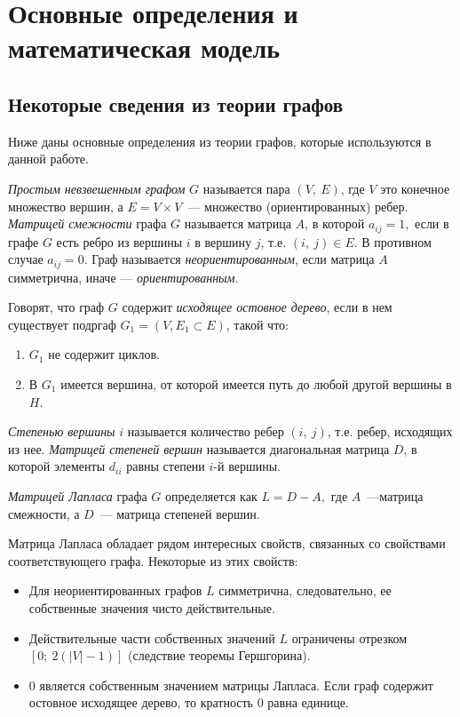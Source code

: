 \chapter{Основные определения и математическая модель} \label{definitions}

\section{Некоторые сведения из теории графов}
Ниже даны основные определения из теории графов, которые используются в данной работе.

\emph{Простым невзвешенным графом} $G$ называется пара $(V,\ E)$, где $V$ это конечное множество вершин, а $E=V\times V$~--- множество (ориентированных) ребер. 
\emph{Матрицей смежности} графа $G$ называется матрица $A$, в которой $a_{ij}=1,$ если в графе $G$ есть ребро из вершины $i$ в вершину $j$, т.е. $(i,\ j)\in E.$ В противном случае $a_{ij}=0.$
Граф называется \emph{неориентированным}, если матрица $A$ симметрична, иначе --- \emph{ориентированным}. 

Говорят, что граф $G$ содержит \emph{исходящее остовное дерево}, если в нем существует подргаф $G_1=(V, E_1\subset E)$, такой что:
\begin{enumerate}
\item $G_1$ не содержит циклов.
\item В $G_1$ имеется вершина, от которой имеется путь до любой другой вершины в $H$.
\end{enumerate}

\emph{Степенью вершины} $i$ называется количество ребер $(i,\ j)$, т.е. ребер, исходящих из нее.
\emph{Матрицей степеней вершин} называется диагональная матрица $D$, в которой элементы $d_{ii}$ равны степени $i$-й вершины.

\begin{definition}
\emph{Матрицей Лапласа} графа $G$ определяется как $L=D-A,$ где $A$~---матрица смежности, а $D$~--- матрица степеней вершин.
\end{definition}

Матрица Лапласа обладает рядом интересных свойств, связанных со свойствами соответствующего графа. Некоторые из этих свойств:

\begin{itemize}
\item Для неориентированных графов $L$ симметрична, следовательно, ее собственные значения чисто действительные.
\item Действительные части собственных значений $L$ ограничены отрезком $[0;\ 2(|V|-1)]$ (следствие теоремы Гершгорина).
\item 0 является собственным значением матрицы Лапласа. Если граф содержит остовное исходящее дерево, то кратность 0 равна единице.
\end{itemize}

